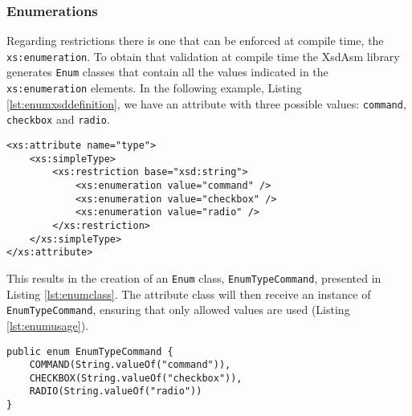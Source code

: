\subsubsection{Enumerations}
\label{sec:enumarations}

Regarding restrictions there is one that can be enforced at compile time, the \texttt{xs:enumeration}. To obtain that validation at compile time the XsdAsm library generates \texttt{Enum} classes that contain all the values indicated in the \texttt{xs:enumeration} elements. In the following example, Listing \ref{lst:enumxsddefinition}, we have an attribute with three possible values: \texttt{command}, \texttt{checkbox} and \texttt{radio}.

\bigskip


\begin{minipage}{\linewidth}
\begin{lstlisting}[caption={Example of an Enumeration in XSD Definition},label={lst:enumxsddefinition}]
<xs:attribute name="type">
    <xs:simpleType>
        <xs:restriction base="xsd:string">
            <xs:enumeration value="command" />
            <xs:enumeration value="checkbox" />
            <xs:enumeration value="radio" />
        </xs:restriction>
    </xs:simpleType>
</xs:attribute>
\end{lstlisting}
\end{minipage}

\noindent
This results in the creation of an \texttt{Enum} class, \texttt{EnumTypeCommand}, presented in Listing \ref{lst:enumclass}. The attribute class will then receive an instance of \texttt{EnumTypeCommand}, ensuring that only allowed values are used (Listing \ref{lst:enumusage}).

\bigskip


\begin{minipage}{\linewidth}
\begin{lstlisting}[caption={Example of a Generated Enumeration Class},label={lst:enumclass}]
public enum EnumTypeCommand {
    COMMAND(String.valueOf("command")), 
    CHECKBOX(String.valueOf("checkbox")),
    RADIO(String.valueOf("radio"))
}
\end{lstlisting}
\end{minipage}


